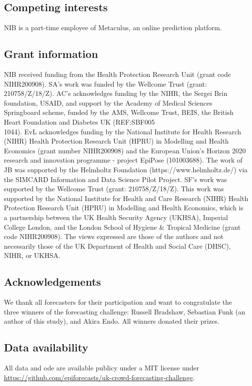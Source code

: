 \documentclass[10pt,a4paper,twocolumn]{article}
\begin{document}
\subsection*{Competing interests}
NIB is a part-time employee of Metaculus, an online prediction platform. 

\subsection*{Grant information}
NIB received funding from the Health Protection Research Unit (grant code NIHR200908). SA's work was funded by the Wellcome Trust (grant: 210758/Z/18/Z). AC's acknowledges funding by the NIHR, the Sergei Brin foundation, USAID, and support by the Academy of Medical Sciences Springboard scheme, funded by the AMS, Wellcome Trust, BEIS, the British Heart Foundation and Diabetes UK (REF:SBF005\\1044). EvL acknowledges funding by the National Institute for Health Research (NIHR) Health Protection Research Unit (HPRU) in Modelling and Health Economics (grant number NIHR200908) and the European Union's Horizon 2020 research and innovation programme - project EpiPose (101003688). The work of JB was supported by the Helmholtz Foundation (https://www.helmholtz.de/) via the SIMCARD Information and Data Science Pilot Project. SF's work was supported by the Wellcome Trust (grant: 210758/Z/18/Z). This work was supported by the National Institute for Health and Care Research (NIHR) Health Protection Research Unit (HPRU) in Modelling and Health Economics, which is a partnership between the UK Health Security Agency (UKHSA), Imperial College London, and the London School of Hygiene \& Tropical Medicine (grant code NIHR200908). The views expressed are those of the authors and not necessarily those of the UK Department of Health and Social Care (DHSC), NIHR, or UKHSA.

\subsection*{Acknowledgements}
We thank all forecasters for their participation and want to congratulate the three winners of the forecasting challenge: Russell Bradshaw, Sebastian Funk (an author of this study), and Akira Endo. All winners donated their prizes. 


\subsection*{Data availability}
All data and ode are available publicy under a MIT license under \url{https://github.com/epiforecasts/uk-crowd-forecasting-challenge}. 
\end{document}
